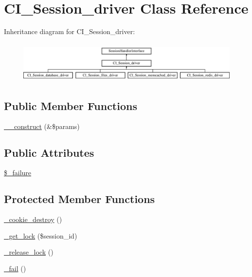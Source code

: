 \hypertarget{class_c_i___session__driver}{}\section{C\+I\+\_\+\+Session\+\_\+driver Class Reference}
\label{class_c_i___session__driver}
Inheritance diagram for C\+I\+\_\+\+Session\+\_\+driver\+:\begin{figure}[H]
\begin{center}
\leavevmode
\includegraphics[height=2.121212cm]{class_c_i___session__driver}
\end{center}
\end{figure}
\subsection*{Public Member Functions}
\begin{DoxyCompactItemize}
\item 
\mbox{\hyperlink{class_c_i___session__driver_ac1669c73d53d6f16cf5459a1e84d39c8}{\+\_\+\+\_\+construct}} (\&\$params)
\end{DoxyCompactItemize}
\subsection*{Public Attributes}
\begin{DoxyCompactItemize}
\item 
\mbox{\hyperlink{class_c_i___session__driver_af597a603db9347ef534b97834ed272a8}{\$\+\_\+failure}}
\end{DoxyCompactItemize}
\subsection*{Protected Member Functions}
\begin{DoxyCompactItemize}
\item 
\mbox{\hyperlink{class_c_i___session__driver_a36771b622e8a8928c1c931ac56c12434}{\+\_\+cookie\+\_\+destroy}} ()
\item 
\mbox{\hyperlink{class_c_i___session__driver_a2c49c8e23be3e2aca96a9d20de18ffc2}{\+\_\+get\+\_\+lock}} (\$session\+\_\+id)
\item 
\mbox{\hyperlink{class_c_i___session__driver_a0265e356e6cf1eaba229663c1664c37d}{\+\_\+release\+\_\+lock}} ()
\item 
\mbox{\hyperlink{class_c_i___session__driver_a1b1bf5bb9cba50e84f985c30f6b64773}{\+\_\+fail}} ()
\end{DoxyCompactItemize}
